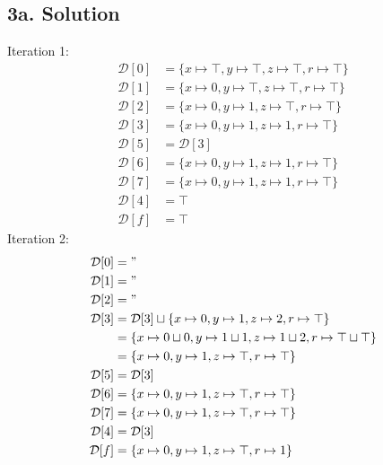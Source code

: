 \documentclass[11pt,a4paper]{scrartcl}
\begin{document}
\begin{minipage}[t]{0.6\textwidth}
\vspace{0pt}
\subsection*{3a. Solution}
Iteration 1:
\begin{align*}
\mathcal{D}[0] &= \{x \mapsto \top, y \mapsto \top, z \mapsto \top, r \mapsto \top\}\\
\mathcal{D}[1] &= \{x \mapsto 0, y \mapsto \top, z \mapsto \top, r \mapsto \top\}\\
\mathcal{D}[2] &= \{x \mapsto 0, y \mapsto 1, z \mapsto \top, r \mapsto \top\}\\
\mathcal{D}[3] &= \{x \mapsto 0, y \mapsto 1, z \mapsto 1, r \mapsto \top\}\\
\mathcal{D}[5] &= \mathcal{D}[3]\\
\mathcal{D}[6] &= \{x \mapsto 0, y \mapsto 1, z \mapsto 1, r \mapsto \top\}\\
\mathcal{D}[7] &= \{x \mapsto 0, y \mapsto 1, z \mapsto 1, r \mapsto \top\}\\
\mathcal{D}[4] &= \top\\
\mathcal{D}[f] &= \top
\end{align*}
Iteration 2:
\begin{align*}
\mathcal{D}[0] &= "\\
\mathcal{D}[1] &= "\\
\mathcal{D}[2] &= "\\
\mathcal{D}[3] &= \mathcal{D}[3] \sqcup \{x \mapsto 0, y \mapsto 1, z \mapsto 2, r \mapsto \top\}\\
&= \{x \mapsto 0 \sqcup 0, y \mapsto 1 \sqcup 1, z \mapsto 1 \sqcup 2, r \mapsto \top \sqcup \top\}\\
&= \{x \mapsto 0, y \mapsto 1, z \mapsto \top, r \mapsto \top\}\\
\mathcal{D}[5] &= \mathcal{D}[3]\\
\mathcal{D}[6] &= \{x \mapsto 0, y \mapsto 1, z \mapsto \top, r \mapsto \top\}\\
\mathcal{D}[7] &= \{x \mapsto 0, y \mapsto 1, z \mapsto \top, r \mapsto \top\}\\
\mathcal{D}[4] &= \mathcal{D}[3]\\
\mathcal{D}[f] &= \{x \mapsto 0, y \mapsto 1, z \mapsto \top, r \mapsto 1\}
\end{align*}
\end{minipage}
\end{document}
